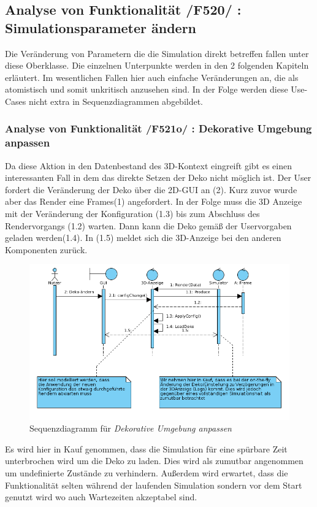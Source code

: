 \subsection{Analyse von Funktionalität /F520/ :  Simulationsparameter ändern}
Die Veränderung von Parametern die die Simulation direkt betreffen fallen unter diese Oberklasse. Die einzelnen Unterpunkte werden in den 2 folgenden Kapiteln erläutert. Im wesentlichen Fallen hier 
auch einfache Veränderungen an, die als atomistisch und somit unkritisch anzusehen sind. In der Folge werden diese Use-Cases nicht extra in Sequenzdiagrammen abgebildet.
\subsubsection{Analyse von Funktionalität /F521o/ :  Dekorative Umgebung anpassen}
Da diese Aktion in den Datenbestand des 3D-Kontext eingreift gibt es einen interessanten Fall in dem das direkte Setzen der Deko nicht möglich ist. 
Der User fordert die Veränderung der Deko über die 2D-GUI an (2). Kurz zuvor wurde aber das Render eine Frames(1) angefordert. In der Folge muss die 3D Anzeige mit der Veränderung der Konfiguration (1.3)
bis zum Abschluss des Rendervorgangs (1.2) warten. Dann kann die Deko gemäß der Uservorgaben geladen werden(1.4). In (1.5) meldet sich die 3D-Anzeige bei den anderen Komponenten zurück. 

\begin{figure}
\includegraphics[width=16cm]{bilder/change_graphic_deko}
\caption{Sequenzdiagramm für \textit{Dekorative Umgebung anpassen}}
\label{labelname}
\end{figure}
Es wird hier in Kauf genommen, dass die Simulation für eine spürbare Zeit unterbrochen wird um die Deko zu laden. Dies wird als zumutbar angenommen um undefinierte Zustände zu verhindern. 
Außerdem wird erwartet, dass die Funktionalität selten während der laufenden Simulation sondern vor dem Start genutzt wird wo auch Wartezeiten akzeptabel sind.

